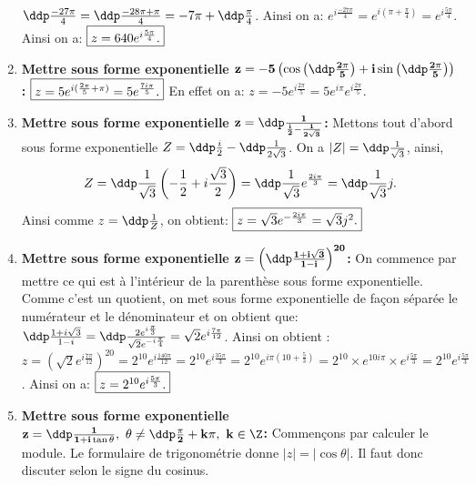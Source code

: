 \begin{correction}
\begin{enumerate}
$\ddp\frac{-27\pi}{4}=\ddp\frac{-28\pi+\pi}{4}=-7\pi+\ddp\frac{\pi}{4}$. Ainsi on a: $e^{i\frac{-27\pi}{4}}=e^{i(\pi+\frac{\pi}{4})}=e^{i\frac{5\pi}{4}}$. Ainsi on a: $\fbox{$ z=640e^{i\frac{5\pi}{4}} .$}$
\item \textbf{Mettre sous forme exponentielle $\mathbf{z=  -5\left(\cos{\left(\ddp\frac{2\pi}{5}\right)} +i\sin{\left(\ddp\frac{2\pi}{5}\right)}  \right) }$:}
$\fbox{$z=5e^{i(\frac{2\pi}{5}+\pi)}=5e^{\frac{7i\pi}{5}}.$}$ En effet on a: $z=-5e^{i\frac{2\pi}{5}}=5e^{i\pi}e^{i\frac{2\pi}{5}}$.
\item \textbf{Mettre sous forme exponentielle $\mathbf{z= \ddp\frac{1}{\frac{i}{2}-\frac{1}{2\sqrt{3}}}  }$:}
Mettons tout d'abord sous forme exponentielle $Z=\ddp\frac{i}{2}-\ddp\frac{1}{2\sqrt{3}}$.
On a $|Z|=\ddp\frac{1}{\sqrt{3}}$, ainsi,
$$Z=\ddp\frac{1}{\sqrt{3}}\left(-\frac{1}{2}+i\frac{\sqrt{3}}{2}   \right)=\ddp\frac{1}{\sqrt{3}}e^{\frac{2i\pi}{3}}=\ddp\frac{1}{\sqrt{3}}j.$$
Ainsi comme $z=\ddp\frac{1}{Z}$, on obtient: $\fbox{$z=\sqrt{3}e^{-\frac{2i\pi}{3}}=\sqrt{3}j^2.$}$
\item \textbf{Mettre sous forme exponentielle $\mathbf{z= \left( \ddp\frac{1+i\sqrt{3}}{1-i}  \right)^{20}   }$:}
On commence par mettre ce qui est \`{a} l'int\'erieur de la parenth\`{e}se sous forme exponentielle. Comme c'est un quotient, on met sous forme exponentielle de fa\c{c}on s\'epar\'ee le num\'erateur et le d\'enominateur et on obtient que: $\ddp\frac{1+i\sqrt{3}}{1-i}=\ddp\frac{  2e^{i\frac{\pi}{3}} }{ \sqrt{2}e^{-i\frac{\pi}{4}}   }=\sqrt{2}e^{i\frac{7\pi}{12}}$. Ainsi on obtient : $z=\left(  \sqrt{2}e^{i\frac{7\pi}{12}} \right)^{20}=2^{10}e^{i\frac{140\pi}{12}}=2^{10}e^{i\frac{35\pi}{3}}=2^{10} e^{i\pi(10+\frac{5}{3})}=2^{10}\times e^{10i\pi}\times e^{i\frac{5\pi}{3}}=2^{10}e^{i\frac{5\pi}{3}}$. Ainsi on a: $\fbox{$z=2^{10}e^{i\frac{5\pi}{3}}.$}$
\item \textbf{Mettre sous forme exponentielle $\mathbf{z=  \ddp\frac{1}{1+i\tan{\theta}},\ \theta\not= \ddp\frac{\pi}{2}+k\pi,\ k\in\Z }$:}
Commen\c{c}ons par calculer le module. Le formulaire de trigonom\'etrie donne $|z|=|\cos{\theta}|$. Il faut donc discuter selon le signe du cosinus.
\end{enumerate}
\end{correction}
